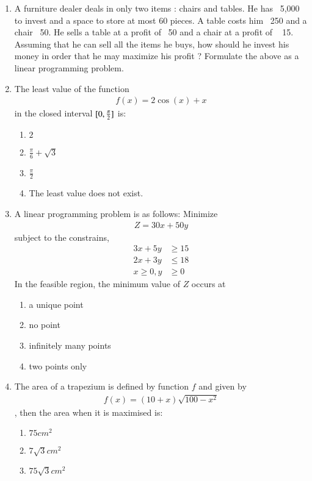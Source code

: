 \documentclass{article}
\DeclarePairedDelimiter{\sbrak}{[}{]}
\begin{document}
\begin{enumerate}
 \item A furniture dealer deals in only two items : chairs and tables. He has \rupee~5,000  to invest and a space to store at most $60$ pieces. A table costs him \rupee~250 and a chair \rupee~50. He sells a table at a profit of \rupee~50 and a chair at
a profit of \rupee~ 15. Assuming that he can sell all the items he buys, how should he invest his money in order that he may maximize his profit ?
Formulate the above as a linear programming problem.
\item The least value of the function 
\begin{align}
	f(x)=2\cos(x) + x
\end{align}
		in the closed interval $\sbrak{0, \frac{\pi}{2}}$ is: 
\begin{enumerate}
    \item  $2$
    \item  $\frac{\pi}{6} + \sqrt{3}$
    \item  $\frac{\pi}{2}$
    \item The least value does not exist.
\end{enumerate}
\item A linear programming problem is as follows:
Minimize 
\begin{align}
	Z=30x+50y 
\end{align}
		subject to the constrains,
\begin{align}
	3x+5y &\geq 15\\
	2x+3y &\leq 18\\
	x \geq 0, y &\geq 0
\end{align}
In the feasible region, the minimum value of $Z$ occurs at 
\begin{enumerate}
    \item a unique point 
    \item no point
    \item infinitely many points 
    \item two points only
\end{enumerate}
\item The area of a trapezium is defined by function $f$
and given by 
\begin{align}
	f(x)=(10+x)\sqrt{100-x^2}
\end{align}
			, then the area when it is maximised is:
\begin{enumerate}
    \item $75cm^2$
    \item $7\sqrt{3}cm^2$
    \item $75\sqrt{3}cm^2$

\end{enumerate}
\end{enumerate}
\end{document}
